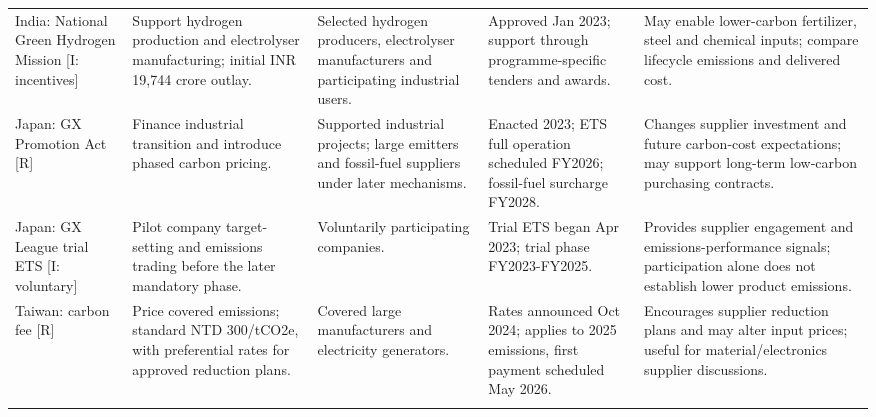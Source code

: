 \documentclass[10pt,a4paper,landscape]{article}
\begin{document}
\begin{tabularx}{\textwidth}{Y{0.85}Y{1.00}Y{0.85}Y{1.05}Y{1.25}}
\addlinespace[5pt]
India: National Green Hydrogen Mission [I: incentives]\cite{indiah2} & Support hydrogen production and electrolyser manufacturing; initial INR 19,744 crore outlay. & Selected hydrogen producers, electrolyser manufacturers and participating industrial users. & Approved Jan 2023; support through programme-specific tenders and awards. & May enable lower-carbon fertilizer, steel and chemical inputs; compare lifecycle emissions and delivered cost. \\
\addlinespace[5pt]
Japan: GX Promotion Act [R]\cite{gxact,gxdates} & Finance industrial transition and introduce phased carbon pricing. & Supported industrial projects; large emitters and fossil-fuel suppliers under later mechanisms. & Enacted 2023; ETS full operation scheduled FY2026; fossil-fuel surcharge FY2028. & Changes supplier investment and future carbon-cost expectations; may support long-term low-carbon purchasing contracts. \\
\addlinespace[5pt]
Japan: GX League trial ETS [I: voluntary]\cite{gxleague} & Pilot company target-setting and emissions trading before the later mandatory phase. & Voluntarily participating companies. & Trial ETS began Apr 2023; trial phase FY2023-FY2025. & Provides supplier engagement and emissions-performance signals; participation alone does not establish lower product emissions. \\
\addlinespace[5pt]
Taiwan: carbon fee [R]\cite{taiwan,twscope} & Price covered emissions; standard NTD 300/tCO2e, with preferential rates for approved reduction plans. & Covered large manufacturers and electricity generators. & Rates announced Oct 2024; applies to 2025 emissions, first payment scheduled May 2026. & Encourages supplier reduction plans and may alter input prices; useful for material/electronics supplier discussions. \\
\addlinespace[5pt]
\end{tabularx}
\normalsize
\clearpage
\end{document}

